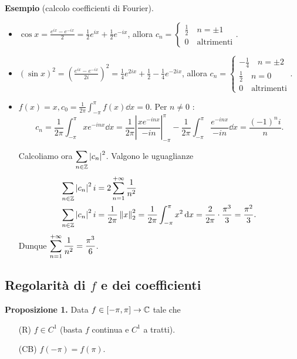 %
%


\textbf{Esempio} (calcolo coefficienti di Fourier).
\begin{itemize}
\item $\cos x = \frac{e^{ix} - e^{-ix}}{2} = \frac{1}{2} e^{ix} + \frac{1}{2} e^{-ix}$, allora $ c_n =
\begin{cases}
\frac{1}{2} \quad n = \pm 1 \\
0 \quad \text{altrimenti} 
\end{cases}. 
$

\item $(\sin x)^2 = (\frac{e^{ix} - e^{-ix}}{2i})^2 = \frac{1}{4} e^{2ix} + \frac{1}{2} - \frac{1}{4} e^{-2ix}$, allora $c_n =
\begin{cases}
-\frac{1}{4} \quad n = \pm 2 \\
\frac{1}{2} \quad n = 0 \\
0 \quad \text{altrimenti} 
\end{cases} $.

\item $f(x) = x, c_0 = \frac{1}{2\pi} \int_{-\pi}^\pi f(x) \dd x = 0$. Per $n \neq 0$ :
%
$$
c_n = \frac{1}{2\pi} \int_{-\pi}^\pi xe^{-inx} \dd x = \frac{1}{2\pi} \left| \frac{x e^{-inx}}{-in} \right|_{-\pi}^\pi - \frac{1}{2\pi} \int_{-\pi}^\pi \frac{e^{-inx}}{-in} \dd x = \frac{(-1)^n i}{n}.
$$
%

Calcoliamo ora  $\displaystyle \sum_{n \in \mathbb Z} \left| c_n \right|^2$.
Valgono le uguaglianze
%
\begin{align*}
\sum_{n \in \mathbb Z} \left| c_n \right|^2i & = 2 \sum_{n=1}^{+\infty} \frac{1}{n^2} \\
\sum_{n \in \mathbb Z} \left| c_n \right|^2i & = \frac{1}{2\pi } \left\lVert x \right\rVert_2^2 = \frac{1}{2\pi } \int_{-\pi}^\pi x^2 \,\mathrm{d} x = \frac{2}{2\pi} \cdot \frac{\pi^3}{3} = \frac{\pi^2}{3}.
\end{align*}
%
Dunque $\displaystyle \sum_{n=1}^{+\infty} \frac{1}{n^2} = \frac{\pi^3}{6}$.

\end{itemize}

\subsection{Regolarità di $f$ e dei coefficienti}

\textbf{Proposizione 1.} Data $f \in [-\pi,\pi] \to \mathbb C$ tale che
\begin{itemize}
\item[(R)] $f \in C^1$ (basta $f$ continua e  $C^1$ a tratti).

\item[(CB)] $f(-\pi) = f(\pi)$.
\end{itemize}

